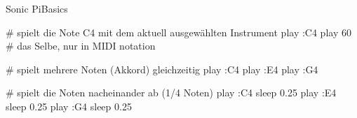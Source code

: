 \documentclass{beamer}
\begin{document}
\begin{frame}[fragile]{Sonic Pi}{Basics}
  \begin{rubycode}

    # spielt die Note C4 mit dem aktuell ausgewählten Instrument
    play :C4
    play 60 # das Selbe, nur in MIDI notation

    # spielt mehrere Noten (Akkord) gleichzeitig
    play :C4
    play :E4
    play :G4

    # spielt die Noten nacheinander ab (1/4 Noten)
    play :C4
    sleep 0.25
    play :E4
    sleep 0.25
    play :G4
    sleep 0.25

  \end{rubycode}
\end{frame}




\end{document}
